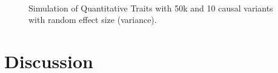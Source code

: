 \begin{figure}
{				\label{fig:50k10cQtvarGre}
			}\\
			\caption[Simulation of Quantitative Traits with 50k  and 10 causal variants with random effect size (variance)]
			{Simulation of Quantitative Traits with 50k  and 10 causal variants with random effect size (variance).} 
			\label{fig:50k10cQtVarre}
		\end{figure}
		
		
	\section{Discussion}